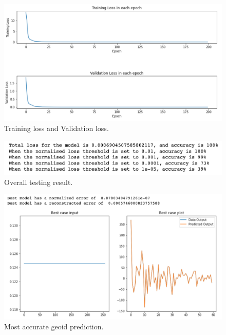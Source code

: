 \begin{figure}[H]
    \caption{Training loss and Validation loss.}
    \includegraphics[scale=0.6]{figures/geoid_images/Geoid_trainingData.png}
\end{figure}

\begin{figure}[H]
    \caption{Overall testing result.}
    \includegraphics[scale=0.8]{figures/geoid_images/Geoid_OverallTesting.png}
\end{figure}

\begin{figure}[H]
    \caption{Most accurate geoid prediction.}
    \includegraphics[scale=0.6]{figures/geoid_images/Geoid_Best.png}
\end{figure}

